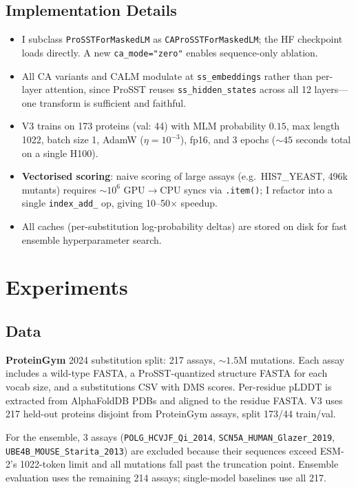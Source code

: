 \documentclass[11pt,a4paper]{article}
\begin{document}
\subsection{Implementation Details}
\begin{itemize}[leftmargin=*,itemsep=0pt]
    \item I subclass \texttt{ProSSTForMaskedLM} as
    \texttt{CAProSSTForMaskedLM}; the HF checkpoint loads directly.
    A new \texttt{ca\_mode="zero"} enables sequence-only ablation.
    \item All CA variants and CALM modulate at \texttt{ss\_embeddings}
    rather than per-layer attention, since ProSST reuses
    \texttt{ss\_hidden\_states} across all 12 layers---one transform is
    sufficient and faithful.
    \item V3 trains on 173 proteins (val: 44) with MLM probability
    $0.15$, max length 1022, batch size 1, AdamW ($\eta{=}10^{-3}$),
    fp16, and 3 epochs ($\sim\!45$ seconds total on a single H100).
    \item \textbf{Vectorised scoring}: naive scoring of large assays
    (e.g.\ HIS7\_YEAST, 496k mutants) requires $\sim\!10^6$ GPU$\to$CPU
    syncs via \texttt{.item()}; I refactor into a single
    \texttt{index\_add\_} op, giving 10--50$\times$ speedup.
    \item All caches (per-substitution log-probability deltas) are
    stored on disk for fast ensemble hyperparameter search.
\end{itemize}

\section{Experiments}

\subsection{Data}
\textbf{ProteinGym} 2024 substitution split: 217 assays,
$\sim\!1.5\text{M}$ mutations. Each assay includes a wild-type FASTA,
a ProSST-quantized structure FASTA for each vocab size, and a
substitutions CSV with DMS scores. Per-residue pLDDT is extracted from
AlphaFoldDB PDBs and aligned to the residue FASTA. V3 uses 217
held-out proteins disjoint from ProteinGym assays, split 173/44
train/val.

For the ensemble, 3 assays (\texttt{POLG\_HCVJF\_Qi\_2014},
\texttt{SCN5A\_HUMAN\_Glazer\_2019}, \texttt{UBE4B\_MOUSE\_Starita\_2013})
are excluded because their sequences exceed ESM-2's 1022-token limit
and all mutations fall past the truncation point. Ensemble evaluation
uses the remaining 214 assays; single-model baselines use all 217.
\end{document}
